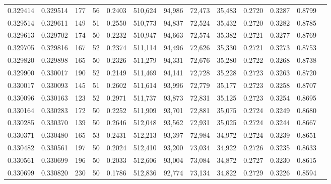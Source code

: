 \begin{tabular}{rrrrrrrrrrrrr}
0.329414 & 0.329514 &   177 &  56 &                                     0.2403 & 510,624 &  94,986 &  72,473 &  35,483 & 0.2720 & 0.3287 & 0.8799 \\
0.329514 & 0.329611 &   149 &  51 &                                     0.2550 & 510,773 &  94,837 &  72,524 &  35,432 & 0.2720 & 0.3282 & 0.8785 \\
0.329613 & 0.329702 &   174 &  50 &                                     0.2232 & 510,947 &  94,663 &  72,574 &  35,382 & 0.2721 & 0.3277 & 0.8769 \\
0.329705 & 0.329816 &   167 &  52 &                                     0.2374 & 511,114 &  94,496 &  72,626 &  35,330 & 0.2721 & 0.3273 & 0.8753 \\
0.329820 & 0.329898 &   165 &  50 &                                     0.2326 & 511,279 &  94,331 &  72,676 &  35,280 & 0.2722 & 0.3268 & 0.8738 \\
0.329900 & 0.330017 &   190 &  52 &                                     0.2149 & 511,469 &  94,141 &  72,728 &  35,228 & 0.2723 & 0.3263 & 0.8720 \\
0.330017 & 0.330093 &   145 &  51 &                                     0.2602 & 511,614 &  93,996 &  72,779 &  35,177 & 0.2723 & 0.3258 & 0.8707 \\
0.330096 & 0.330163 &   123 &  52 &                                     0.2971 & 511,737 &  93,873 &  72,831 &  35,125 & 0.2723 & 0.3254 & 0.8695 \\
0.330164 & 0.330283 &   172 &  50 &                                     0.2252 & 511,909 &  93,701 &  72,881 &  35,075 & 0.2724 & 0.3249 & 0.8680 \\
0.330285 & 0.330370 &   139 &  50 &                                     0.2646 & 512,048 &  93,562 &  72,931 &  35,025 & 0.2724 & 0.3244 & 0.8667 \\
0.330371 & 0.330480 &   165 &  53 &                                     0.2431 & 512,213 &  93,397 &  72,984 &  34,972 & 0.2724 & 0.3239 & 0.8651 \\
0.330482 & 0.330561 &   197 &  50 &                                     0.2024 & 512,410 &  93,200 &  73,034 &  34,922 & 0.2726 & 0.3235 & 0.8633 \\
0.330561 & 0.330699 &   196 &  50 &                                     0.2033 & 512,606 &  93,004 &  73,084 &  34,872 & 0.2727 & 0.3230 & 0.8615 \\
0.330699 & 0.330820 &   230 &  50 &                                     0.1786 & 512,836 &  92,774 &  73,134 &  34,822 & 0.2729 & 0.3226 & 0.8594 \\

\end{tabular}
